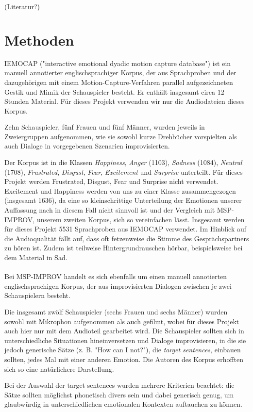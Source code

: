 \documentclass{article} %
\begin{document}
(Literatur?)
\section{Methoden}
IEMOCAP ("interactive emotional dyadic motion capture
database") ist ein manuell annotierter englischsprachiger Korpus, der aus Sprachproben und der dazugehörigen mit einem Motion-Capture-Verfahren parallel aufgezeichneten Gestik und Mimik der Schauspieler besteht. Er enthält insgesamt circa 12 Stunden Material. Für dieses Projekt verwenden wir nur die Audiodateien dieses Korpus. 

Zehn Schauspieler, fünf Frauen und fünf Männer, wurden jeweils in Zweiergruppen aufgenommen, wie sie sowohl kurze Drehbücher vorspielten als auch Dialoge in vorgegebenen Szenarien improvisierten. 

Der Korpus ist in die Klassen \emph{Happiness}, \emph{Anger} (1103), \emph{Sadness} (1084), \emph{Neutral} (1708), \emph{Frustrated}, \emph{Disgust}, \emph{Fear}, \emph{Excitement} und \emph{Surprise} unterteilt. Für dieses Projekt werden Frustrated, Disgust, Fear und Surprise nicht verwendet. Excitement und Happiness werden von uns zu einer Klasse zusammengezogen (insgesamt 1636), da eine so kleinschrittige Unterteilung der Emotionen unserer Auffassung nach in diesem Fall nicht sinnvoll ist und der Vergleich mit MSP-IMPROV, unserem zweiten Korpus, sich so vereinfachen lässt. Insgesamt werden für dieses Projekt 5531 Sprachproben aus IEMOCAP verwendet. 
Im Hinblick auf die Audioqualität fällt auf, dass oft fetzenweise die Stimme des Gesprächspartners zu hören ist. Zudem ist teilweise Hintergrundrauschen hörbar, beispielsweise bei dem Material in Sad. \\ \\
Bei MSP-IMPROV handelt es sich ebenfalls um einen manuell annotierten englischsprachigen Korpus, der aus improvisierten Dialogen zwischen je zwei Schauspielern besteht. 

Die insgesamt zwölf Schauspieler (sechs Frauen und sechs Männer) wurden sowohl mit Mikrophon aufgenommen als auch gefilmt, wobei für dieses Projekt auch hier nur mit dem Audioteil gearbeitet wird. Die Schauspieler sollten sich in unterschiedliche Situationen hineinversetzen und Dialoge improvisieren, in die sie jedoch generische Sätze (z. B. "How can I not?"), die \emph{target sentences}, einbauen sollten, jedes Mal mit einer anderen Emotion. Die Autoren des Korpus erhofften sich so eine natürlichere Darstellung. 

Bei der Auswahl der target sentences wurden mehrere Kriterien beachtet: die Sätze sollten möglichst phonetisch divers sein und dabei generisch genug, um glaubwürdig in unterschiedlichen emotionalen Kontexten auftauchen zu können. 
\end{document}
